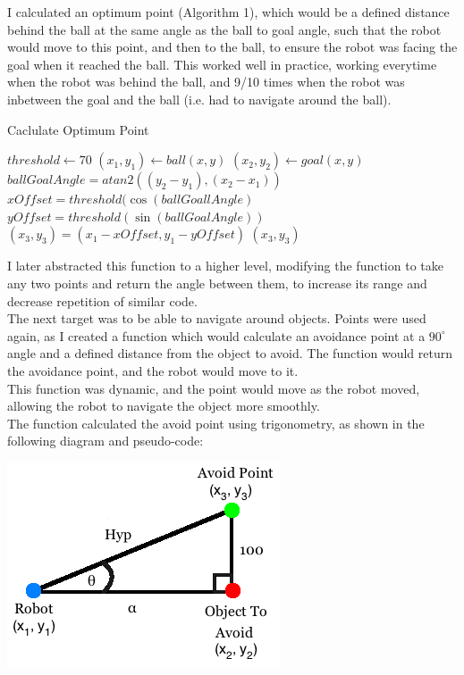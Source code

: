 \documentclass[12pt]{IEEEtran}
\begin{document}
I calculated an optimum point (Algorithm 1), which would be a defined distance behind the ball at the same angle as the ball to goal angle, such that the robot would move to this point, and then to the ball, to ensure the robot was facing the goal when it reached the ball. This worked well in practice, working everytime when the robot was behind the ball, and 9/10 times when the robot was inbetween the goal and the ball (i.e. had to navigate around the ball).


\begin{algorithm}
\caption{Caclulate Optimum Point}
\begin{algorithmic}[1]
\STATE $threshold \gets 70$
\STATE $(x_{1}, y_{1}) \gets ball (x, y)$
\STATE $(x_{2}, y_{2}) \gets goal (x, y)$
\STATE $ballGoalAngle = atan2( (y_{2} - y_{1}), (x_{2} - x_{1}) )$
\STATE $xOffset = threshold(\cos(ballGoallAngle)$
\STATE $yOffset = threshold(\sin(ballGoalAngle))$
\STATE $(x_{3}, y_{3}) = (x_{1} - xOffset, y_{1} - yOffset)$
\RETURN $(x_{3}, y_{3})$
\end{algorithmic}
\end{algorithm}

I later abstracted this function to a higher level, modifying the function to take any two points and return the angle between them, to increase its range and decrease repetition of similar code. \\

The next target was to be able to navigate around objects. Points were used again, as I created a function which would calculate an avoidance point at a $90^{\circ}$ angle and a defined distance from the object to avoid. The function would return the avoidance point, and the robot would move to it. \\
This function was dynamic, and the point would move as the robot moved, allowing the robot to navigate the object more smoothly.\\
The function calculated the avoid point using trigonometry, as shown in the following diagram and pseudo-code:\\
\begin{center}
\includegraphics[scale=0.6]{AvoidPoints.png}\\
\end{center}
\end{document}

